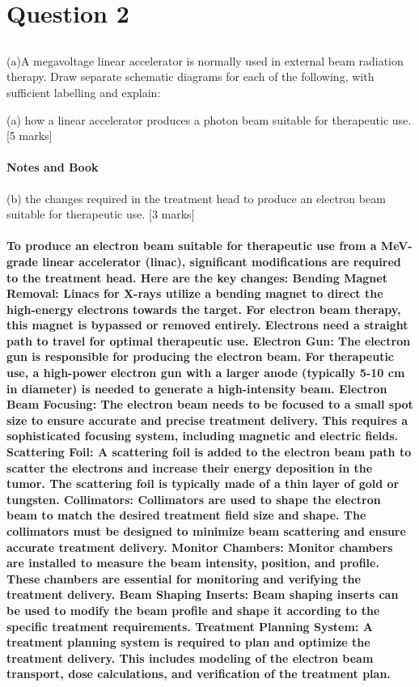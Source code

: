 \documentclass[11pt,letterpaper]{article}
\begin{document}
\newpage
\section{Question 2}

\subsection*{}(a)A megavoltage linear accelerator is normally used in external beam radiation therapy. Draw separate schematic diagrams for each of the following, with sufficient labelling and explain:

(a) how a linear accelerator produces a photon beam suitable for therapeutic use. [5 marks]
\paragraph{Notes and Book}


(b) the changes required in the treatment head to produce an electron beam suitable for therapeutic use. [3 marks]

\paragraph*{To produce an electron beam suitable for therapeutic use from a MeV-grade linear accelerator (linac), significant modifications are required to the treatment head. Here are the key changes:
Bending Magnet Removal:  Linacs for X-rays utilize a bending magnet to direct the high-energy electrons towards the target.  For electron beam therapy, this magnet is bypassed or removed entirely. Electrons need a straight path to travel for optimal therapeutic use.
Electron Gun: The electron gun is responsible for producing the electron beam. For therapeutic use, a high-power electron gun with a larger anode (typically 5-10 cm in diameter) is needed to generate a high-intensity beam.
Electron Beam Focusing: The electron beam needs to be focused to a small spot size to ensure accurate and precise treatment delivery. This requires a sophisticated focusing system, including magnetic and electric fields.
Scattering Foil: A scattering foil is added to the electron beam path to scatter the electrons and increase their energy deposition in the tumor. The scattering foil is typically made of a thin layer of gold or tungsten.
Collimators: Collimators are used to shape the electron beam to match the desired treatment field size and shape. The collimators must be designed to minimize beam scattering and ensure accurate treatment delivery.
Monitor Chambers: Monitor chambers are installed to measure the beam intensity, position, and profile. These chambers are essential for monitoring and verifying the treatment delivery.
Beam Shaping Inserts: Beam shaping inserts can be used to modify the beam profile and shape it according to the specific treatment requirements.
Treatment Planning System: A treatment planning system is required to plan and optimize the treatment delivery. This includes modeling of the electron beam transport, dose calculations, and verification of the treatment plan.
}
\end{document}
